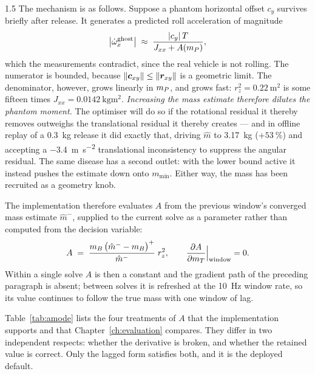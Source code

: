 \begin{spacing}{1.5}
The mechanism is as follows. Suppose a phantom horizontal offset $c_y$ survives
briefly after release. It generates a predicted roll acceleration of magnitude
\begin{equation}
\bigl|\dot\omega_x^{\text{ghost}}\bigr| \;\approx\; \frac{|c_y|\,T}{J_{xx} + A(m_P)},
\label{eq:ghost}
\end{equation}
which the measurements contradict, since the real vehicle is not rolling. The
numerator is bounded, because $\lVert\bm{c}_{xy}\rVert\le\lVert\bm{r}_{xy}\rVert$ is a
geometric limit. The denominator, however, grows linearly in $m_P$, and grows
fast: $r_z^2=\SI{0.22}{\meter\squared}$ is some fifteen times
$J_{xx}=\SI{0.0142}{\kg\meter\squared}$. \emph{Increasing the mass estimate
therefore dilutes the phantom moment.} The optimiser will do so if the rotational
residual it thereby removes outweighs the translational residual it thereby
creates --- and in offline replay of a \SI{0.3}{\kg} release it did exactly that,
driving $\hat m$ to \SI{3.17}{\kg} ($+\SI{53}{\percent}$) and accepting a
\SI{-3.4}{\meter\per\second\squared} translational inconsistency to suppress the
angular residual. The same disease has a second outlet: with the lower bound
active it instead pushes the estimate down onto $m_{\min}$. Either way, the mass
has been recruited as a geometry knob.

The implementation therefore evaluates $A$ from the previous window's converged
mass estimate $\hat m^{-}$, supplied to the current solve as a parameter rather
than computed from the decision variable:
\begin{equation}
A \;=\; \frac{m_B\,\bigl(\hat m^{-}-m_B\bigr)^{+}}{\hat m^{-}}\; r_z^2,
\qquad
\frac{\partial A}{\partial m_T}\Big|_{\text{window}} = 0 .
\label{eq:Afrozen}
\end{equation}
Within a single solve $A$ is then a constant and the gradient path of the
preceding paragraph is absent; between solves it is refreshed at the
\SI{10}{\hertz} window rate, so its value continues to follow the true mass with
one window of lag.

Table~\ref{tab:amode} lists the four treatments of $A$ that the implementation
supports and that Chapter~\ref{ch:evaluation} compares. They differ in two
independent respects: whether the derivative is broken, and whether the retained
value is correct. Only the lagged form satisfies both, and it is the deployed
default.


\end{spacing}
